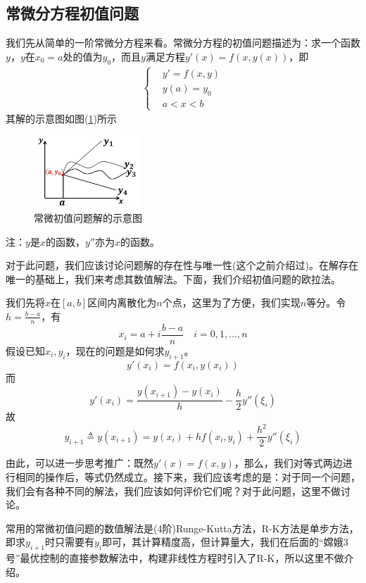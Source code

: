 	\subsection{常微分方程初值问题}
		我们先从简单的一阶常微分方程来看。常微分方程的初值问题描述为：求一个函数$y$，$y$在$x_0=a$处的值为$y_0$，而且$y$满足方程$y'(x)=f(x,y(x))$，即
		\begin{align*}
			\left\{
				\begin{aligned}
					&y'=f(x,y)\\
					&y(a)=y_0\\
					&a<x<b
				\end{aligned}
			\right.
		\end{align*}
		其解的示意图如图(\ref{fig:常微初值问题解的示意图})所示
		\begin{figure}[H]
		\centering
		\includegraphics[width=4cm]{images/Initial_value_problems_of_ordinary_differential_equations.jpg}
		\caption{常微初值问题解的示意图}
		\label{fig:常微初值问题解的示意图}
		\end{figure}
		\noindent 注：$y$是$x$的函数，$y''$亦为$x$的函数。
		\par
		对于此问题，我们应该讨论问题解的存在性与唯一性(这个之前介绍过)。在解存在唯一的基础上，我们来考虑其数值解法。下面，我们介绍初值问题的欧拉法。
		\par
		我们先将$x$在$[a,b]$区间内离散化为$n$个点，这里为了方便，我们实现$n$等分。令$h=\frac{b-a}{n}$，有
		\[
			x_i=a+i\frac{b-a}{n}\quad i=0,1,\dots,n
		\]
		假设已知$x_i,y_i$，现在的问题是如何求$y_{i+1}$。
		\[
			y'(x_i)=f(x_i,y(x_i))
		\]
		而
		\[
			y'(x_i)=\frac{y(x_{i+1})-y(x_i)}{h}-\frac{h}{2}y''(\xi_i)
		\]
		故
		\[
			y_{i+1}\triangleq y(x_{i+1})=y(x_i)+hf(x_i,y_i)+\frac{h^2}{2}y''(\xi_i)
		\]
		\par
		由此，可以进一步思考推广：既然$y'(x)=f(x,y)$，那么，我们对等式两边进行相同的操作后，等式仍然成立。接下来，我们应该考虑的是：对于同一个问题，我们会有各种不同的解法，我们应该如何评价它们呢？对于此问题，这里不做讨论。
		\par
		常用的常微初值问题的数值解法是(4阶)Runge-Kutta方法，R-K方法是单步方法，即求$y_{i+1}$时只需要有$y_i$即可，其计算精度高，但计算量大，我们在后面的“嫦娥3号”最优控制的直接参数解法中，构建非线性方程时引入了R-K，所以这里不做介绍。

